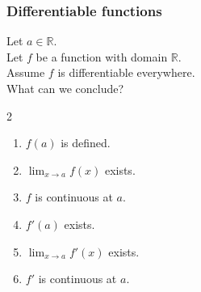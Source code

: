 \documentclass[14pt]{beamer}
\newcommand {\DS} [1] {${\displaystyle #1}$}
\newcommand {\R}{\mathbb{R}}
\begin{document}
\begin{frame}[t]
\frametitle{Differentiable functions}

Let $a \in \R$.  \\
Let $f$ be a function with domain $\R$.  \\
Assume $f$ is differentiable everywhere.  \\
What can we conclude?

\begin{multicols}{2}
\begin{enumerate}
	\item  $f(a)$ is defined.
	\item \DS{\lim_{x \to a} f(x)} exists.
	\item  $f$ is continuous at $a$.
	\item  $f'(a)$ exists.
	\item  \DS{\lim_{x \to a} f'(x)} exists.
	\item  \DS{f'} is continuous at $a$.
\end{enumerate}
\end{multicols}
 
\end{frame}
\end{document}
